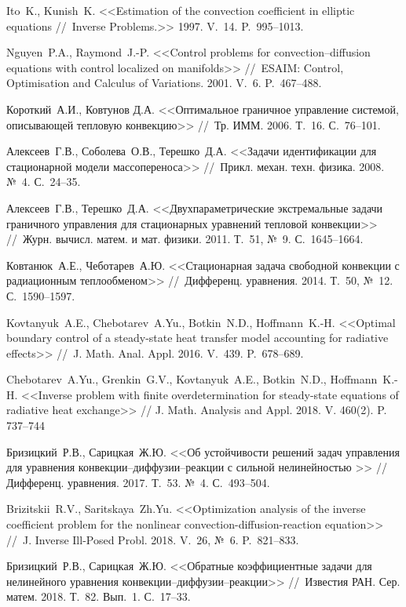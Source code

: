 \begin{thebibliography}{1}
	
	 Ito~K., Kunish~K. <<Estimation of the convection coefficient in elliptic equations //~Inverse Problems.>> 1997. V.~14. P.~995--1013.

	 Nguyen~P.A., Raymond~J.-P. <<Control problems for convection--diffusion equations with control localized on manifolds>> //~ESAIM: Control, Optimisation and Calculus of Variations. 2001. V.~6. P.~467--488.

	 Короткий~А.И., Ковтунов Д.А. <<Оптимальное граничное управление системой, описывающей тепловую конвекцию>> //~Тр. ИММ. 2006. Т.~16. С.~76--101.

	 Алексеев~Г.В., Соболева~О.В., Терешко~Д.А. <<Задачи идентификации для стационарной модели массопереноса>> //~Прикл. механ. техн. физика. 2008. №~4. С.~24--35.

	 Алексеев~Г.В., Терешко~Д.А. <<Двухпараметрические экстремальные  задачи  граничного управления для стационарных уравнений тепловой конвекции>> //~Журн. вычисл. матем. и мат. физики. 2011. Т.~51, №~9. С.~1645--1664.

	 Ковтанюк~А.Е., Чеботарев~А.Ю. <<Стационарная задача свободной конвекции с радиационным теплообменом>> //~Дифференц. уравнения. 2014. Т.~50, №~12. С.~1590--1597.

	 Kovtanyuk~A.E., Chebotarev~A.Yu., Botkin~N.D., Hoffmann~K.-H. <<Optimal boundary control of a steady-state heat transfer model accounting for radiative effects>> //~J. Math. Anal. Appl. 2016. V.~439. P.~678--689.

	 Chebotarev~A.Yu., Grenkin~G.V., Kovtanyuk~A.E., Botkin~N.D., Hoffmann~K.-H. <<Inverse problem with finite overdetermination for steady-state equations of radiative heat exchange>> // J. Math. Analysis and Appl. 2018. V. 460(2). P.~ 737--744

	 Бризицкий~Р.В., Сарицкая~Ж.Ю. <<Об устойчивости решений задач управления для уравнения конвекции--диффузии--реакции с сильной нелинейностью >> // Дифференц. уравнения. 2017. Т.~53. №~4. С.~493--504.

	 Brizitskii~R.V., Saritskaya~Zh.Yu. <<Optimization analysis of the inverse coefficient problem for the nonlinear convection-diffusion-reaction equation>> //~J. Inverse Ill-Posed Probl. 2018. V.~26, №~6. P.~821--833.

	 Бризицкий~Р.В., Сарицкая~Ж.Ю. <<Обратные коэффициентные задачи для нелинейного уравнения конвекции--диффузии--реакции>> //~Известия РАН. Сер. матем. 2018. Т.~82. Вып.~1. С.~17--33.


\end{thebibliography}
